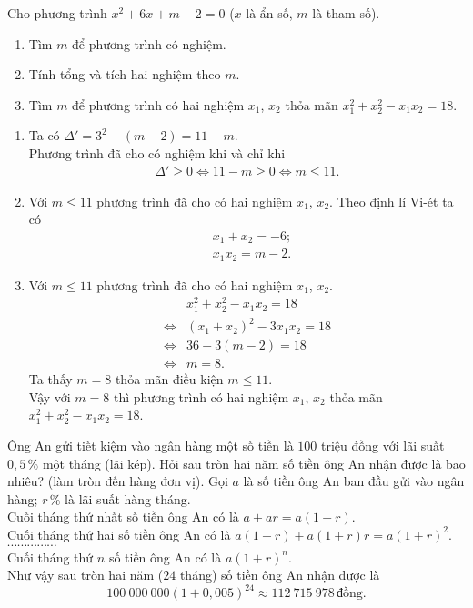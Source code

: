\begin{ex}%
 Cho phương trình $x^2 + 6x + m - 2 = 0$ ($x$ là ẩn số, $m$ là tham số).
 \begin{enumerate}
  \item Tìm $m$ để phương trình có nghiệm.
  \item Tính tổng và tích hai nghiệm theo $m$.
  \item Tìm $m$ để phương trình có hai nghiệm $x_1$, $x_2$ thỏa mãn $x_1^2 + x_2^2 - x_1 x_2 = 18$.
 \end{enumerate}
 \loigiai
  {
  \begin{enumerate}
   \item Ta có $\Delta' = 3^2 - (m - 2) = 11 - m$.\\
   Phương trình đã cho có nghiệm khi và chỉ khi
   \begin{align*}
    \Delta' \geq 0 \Leftrightarrow 11-m \geq 0 \Leftrightarrow m \leq 11.
   \end{align*}
   \item Với $m \leq 11$ phương trình đã cho có hai nghiệm $x_1$, $x_2$. Theo định lí Vi-ét ta có
   \begin{align*}
    & x_1 + x_2 = -6;\\
    & x_1x_2 = m-2.
   \end{align*}
   \item Với $m \leq 11$ phương trình đã cho có hai nghiệm $x_1$, $x_2$.
   \begin{align*}
    				& x_1^2 + x_2^2 - x_1 x_2 = 18 \\
    \Leftrightarrow & (x_1+x_2)^2 - 3x_1x_2 = 18 \\
    \Leftrightarrow & 36 - 3(m-2) = 18 \\
    \Leftrightarrow & m = 8.
   \end{align*}
   Ta thấy $m = 8$ thỏa mãn điều kiện $m \leq 11$.\\
   Vậy với $m = 8$ thì phương trình có hai nghiệm $x_1$, $x_2$ thỏa mãn $x_1^2 + x_2^2 - x_1 x_2 = 18$.
  \end{enumerate}
  }
\end{ex}


\begin{ex}%
 Ông An gửi tiết kiệm vào ngân hàng một số tiền là $100$ triệu đồng với lãi suất $0{,}5 \, \%$ một tháng (lãi kép). Hỏi sau tròn hai năm số tiền ông An nhận được là bao nhiêu? (làm tròn đến hàng đơn vị).
 \loigiai
  {
  Gọi $a$ là số tiền ông An ban đầu gửi vào ngân hàng; $r\,\%$ là lãi suất hàng tháng.\\
  Cuối tháng thứ nhất số tiền ông An có là $a + ar = a(1+r)$.\\
  Cuối tháng thứ hai số tiền ông An có là $a(1+r)+a(1+r)r = a(1+r)^2$.\\
  $\cdots\cdots\cdots\cdots\cdots$\\
  Cuối tháng thứ $n$ số tiền ông An có là $a(1+r)^n$.\\
  Như vậy sau tròn hai năm ($24$ tháng) số tiền ông An nhận được là
  $$100\ 000 \ 000 (1 + 0{,}005)^{24} \approx 112 \ 715 \ 978 \, \text{đồng}.$$
  }
\end{ex}


